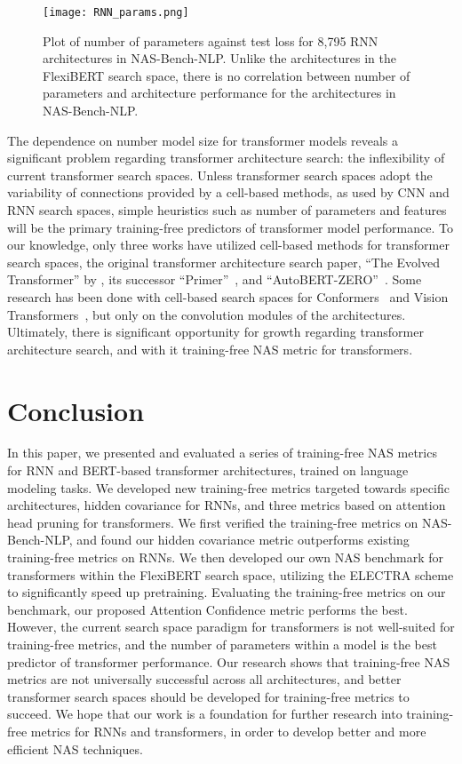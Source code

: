 \documentclass[11pt]{article}
\begin{document}
    \begin{figure}[h]
        \centering
        \texttt{[image: RNN\_params.png]}
        \caption{Plot of number of parameters against test loss for 
        8,795 RNN architectures in NAS-Bench-NLP. Unlike the architectures in the FlexiBERT search space, there is no correlation between number of parameters and architecture performance for the architectures in NAS-Bench-NLP.}
        \label{fig4}
    \end{figure}

    The dependence on number model size for transformer models reveals a significant problem regarding transformer architecture search: the inflexibility of current transformer search spaces. Unless transformer search spaces adopt the variability of connections provided by a cell-based methods, as used by CNN and RNN search spaces, simple heuristics such as number of parameters and features will be the primary training-free predictors of transformer model performance. To our knowledge, only three works have utilized cell-based methods for transformer search spaces, the original transformer architecture search paper, ``The Evolved Transformer'' by \citet{so_evolved_2019}, its successor ``Primer''~\cite{so_searching_2021}, and ``AutoBERT-ZERO''~\cite{gao_autobert-zero_2022}. Some research has been done with cell-based search spaces for Conformers~\cite{shi_efficient_2021} and Vision Transformers~\cite{guo_nat_2020}, but only on the convolution modules of the architectures. Ultimately, there is significant opportunity for growth regarding transformer architecture search, and with it training-free NAS metric for transformers.


\section{Conclusion}
    In this paper, we presented and evaluated a series of training-free NAS metrics for RNN and BERT-based transformer architectures, trained on language modeling tasks. We developed new training-free metrics targeted towards specific architectures, hidden covariance for RNNs, and three metrics based on attention head pruning for transformers. We first verified the training-free metrics on  NAS-Bench-NLP, and found our hidden covariance metric outperforms existing training-free metrics on RNNs. We then developed our own NAS benchmark for transformers within the FlexiBERT search space, utilizing the ELECTRA scheme to significantly speed up pretraining. Evaluating the training-free metrics on our benchmark, our proposed Attention Confidence metric performs the best. However, the current search space paradigm for transformers is not well-suited for training-free metrics, and the number of parameters within a model is the best predictor of transformer performance. Our research shows that training-free NAS metrics are not universally successful across all architectures, and better transformer search spaces should be developed for training-free metrics to succeed. We hope that our work is a foundation for further research into training-free metrics for RNNs and transformers, in order to develop better and more efficient NAS techniques.
\end{document}
